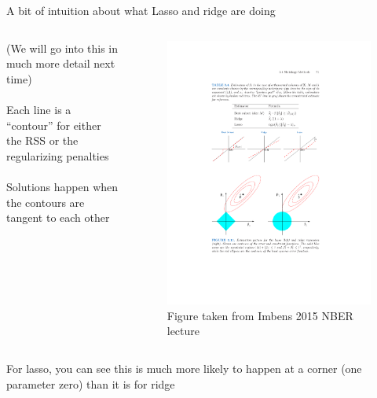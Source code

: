 \documentclass[mathserif, aspectratio=169]{beamer}
\begin{document}
\begin{frame}{A bit of intuition about what Lasso and ridge are doing}
\begin{columns}
(We will go into this in much more detail next time)\\~\\

Each line is a ``contour'' for either the RSS or the regularizing penalties\\~\\

Solutions happen when the contours are tangent to each other
\begin{figure}
\includegraphics[scale=0.6]{lasso_v_ridge}
\caption*{\tiny Figure taken from Imbens 2015 NBER lecture}
\end{figure}
\end{columns}

\vspace{5mm}

For lasso, you can see this is much more likely to happen at a corner (one parameter zero) than it is for ridge
\end{frame}
\end{document}
